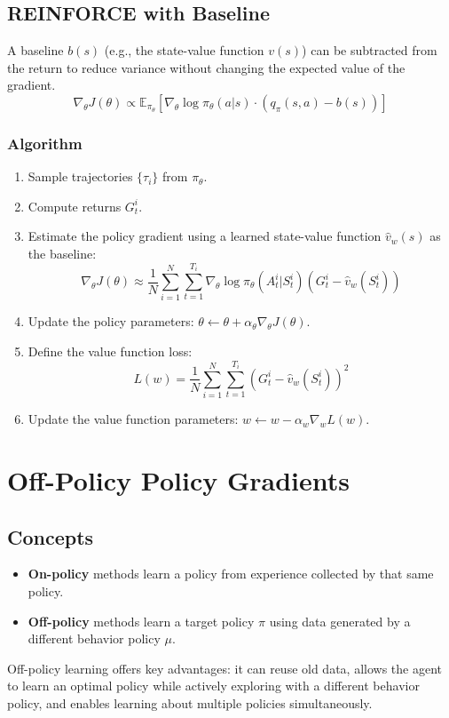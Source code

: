 \documentclass[12pt]{article}
\begin{document}
\subsection{REINFORCE with Baseline}
A baseline $b(s)$ (e.g., the state-value function $v(s)$) can be subtracted from the return to reduce variance without changing the expected value of the gradient.
$$ \nabla_\theta J(\theta) \propto \mathbb{E}_{\pi_\theta} \left[ \nabla_\theta \log \pi_\theta(a|s) \cdot (q_\pi(s,a) - b(s)) \right] $$

\subsubsection{Algorithm}
\begin{enumerate}
    \item Sample trajectories $\{\tau_i\}$ from $\pi_\theta$.
    \item Compute returns $G_t^i$.
    \item Estimate the policy gradient using a learned state-value function $\hat{v}_w(s)$ as the baseline:
    $$ \nabla_\theta J(\theta) \approx \frac{1}{N} \sum_{i=1}^N \sum_{t=1}^{T_i} \nabla_\theta \log \pi_\theta(A_t^i | S_t^i) (G_t^i - \hat{v}_w(S_t^i)) $$
    \item Update the policy parameters: $\theta \leftarrow \theta + \alpha_\theta \nabla_\theta J(\theta)$.
    \item Define the value function loss:
    $$ L(w) = \frac{1}{N} \sum_{i=1}^N \sum_{t=1}^{T_i} (G_t^i - \hat{v}_w(S_t^i))^2 $$
    \item Update the value function parameters: $w \leftarrow w - \alpha_w \nabla_w L(w)$.
\end{enumerate}

\section{Off-Policy Policy Gradients }

\subsection{Concepts}
\begin{itemize}
    \item \textbf{On-policy} methods learn a policy from experience collected by that same policy.
    \item \textbf{Off-policy} methods learn a target policy $\pi$ using data generated by a different behavior policy $\mu$.
\end{itemize}
Off-policy learning offers key advantages: it can reuse old data, allows the agent to learn an optimal policy while actively exploring with a different behavior policy, and enables learning about multiple policies simultaneously.
\end{document}
